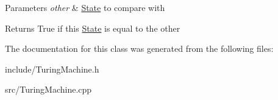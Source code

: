\begin{DoxyParams}{Parameters}
{\em other} & \hyperlink{classState}{State} to compare with \\
\hline
\end{DoxyParams}
\begin{DoxyReturn}{Returns}
True if this \hyperlink{classState}{State} is equal to the other 
\end{DoxyReturn}


The documentation for this class was generated from the following files\+:\begin{DoxyCompactItemize}
\item 
include/Turing\+Machine.\+h\item 
src/Turing\+Machine.\+cpp\end{DoxyCompactItemize}
